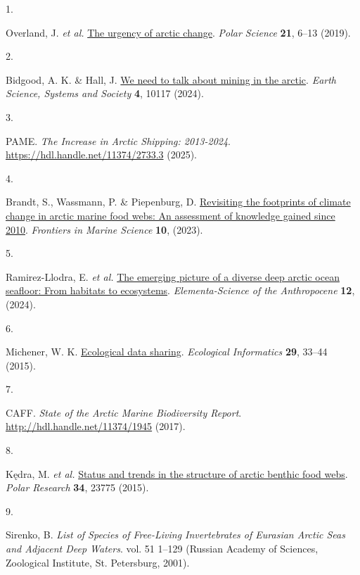 \documentclass[
  letterpaper,
  DIV=11,
  numbers=noendperiod]{scrartcl}
\newlength{\cslhangindent}
\newlength{\csllabelwidth}
\newenvironment{CSLReferences}[2] %
 {\begin{list}{}{%
  \setlength{\itemindent}{0pt}
  \setlength{\leftmargin}{0pt}
  \setlength{\parsep}{0pt}
  \ifodd #1
   \setlength{\leftmargin}{\cslhangindent}
   \setlength{\itemindent}{-1\cslhangindent}
  \fi
  \setlength{\itemsep}{#2\baselineskip}}}
 {\end{list}}
\newcommand{\CSLLeftMargin}[1]{\parbox[t]{\csllabelwidth}{\strut#1\strut}}
\newcommand{\CSLRightInline}[1]{\parbox[t]{\linewidth - \csllabelwidth}{\strut#1\strut}}
\begin{document}
\protect{}\label{refs}
\begin{CSLReferences}{0}{0}
\CSLLeftMargin{1. }%
\CSLRightInline{Overland, J. \emph{et al.}
\href{https://doi.org/10.1016/j.polar.2018.11.008}{The urgency of arctic
change}. \emph{Polar Science} \textbf{21}, 6--13 (2019).}

\CSLLeftMargin{2. }%
\CSLRightInline{Bidgood, A. K. \& Hall, J.
\href{https://doi.org/10.3389/esss.2024.10117}{We need to talk about
mining in the arctic}. \emph{Earth Science, Systems and Society}
\textbf{4}, 10117 (2024).}

\CSLLeftMargin{3. }%
\CSLRightInline{PAME. \emph{The Increase in Arctic Shipping: 2013-2024}.
\url{https://hdl.handle.net/11374/2733.3} (2025).}

\CSLLeftMargin{4. }%
\CSLRightInline{Brandt, S., Wassmann, P. \& Piepenburg, D.
\href{https://doi.org/10.3389/fmars.2023.1096222}{Revisiting the
footprints of climate change in arctic marine food webs: An assessment
of knowledge gained since 2010}. \emph{Frontiers in Marine Science}
\textbf{10}, (2023).}

\CSLLeftMargin{5. }%
\CSLRightInline{Ramirez-Llodra, E. \emph{et al.}
\href{https://doi.org/10.1525/elementa.2023.00140}{The emerging picture
of a diverse deep arctic ocean seafloor: From habitats to ecosystems}.
\emph{Elementa-Science of the Anthropocene} \textbf{12}, (2024).}

\CSLLeftMargin{6. }%
\CSLRightInline{Michener, W. K.
\href{https://doi.org/10.1016/j.ecoinf.2015.06.010}{Ecological data
sharing}. \emph{Ecological Informatics} \textbf{29}, 33--44 (2015).}

\CSLLeftMargin{7. }%
\CSLRightInline{CAFF. \emph{State of the Arctic Marine Biodiversity
Report}. \url{http://hdl.handle.net/11374/1945} (2017).}

\CSLLeftMargin{8. }%
\CSLRightInline{Kędra, M. \emph{et al.}
\href{https://doi.org/10.3402/polar.v34.23775}{Status and trends in the
structure of arctic benthic food webs}. \emph{Polar Research}
\textbf{34}, 23775 (2015).}

\CSLLeftMargin{9. }%
\CSLRightInline{Sirenko, B. \emph{List of Species of Free-Living
Invertebrates of Eurasian Arctic Seas and Adjacent Deep Waters}. vol. 51
1--129 (Russian Academy of Sciences, Zoological Institute, St.
Petersburg, 2001).}


\end{CSLReferences}
\end{document}

